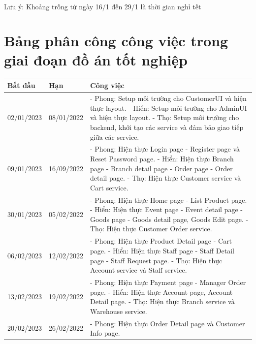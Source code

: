 Lưu ý: Khoảng trống từ ngày 16/1 đến 29/1 là thời gian nghỉ tết

\newpage
\section{Bảng phân công công việc trong giai đoạn đồ án tốt nghiệp}
{
\setlength\extrarowheight{6pt}
\begin{longtable}{| p{2cm} | p{2cm} | p{10cm} |}

	\hline
	\textbf{Bắt đầu} & \textbf{Hạn} & \textbf{Công việc} \\
	\hline
	02/01/2023 & 08/01/2022 & 
    - Phong: Setup môi trường cho CustomerUI và hiện thực layout. 
    \newline
    - Hiển: Setup môi trường cho AdminUI và hiện thực layout.
    \newline
    - Thọ: Setup môi trường cho backend, khởi tạo các service và đảm bảo giao tiếp giữa các service. \\
	\hline
	09/01/2023 & 16/09/2022 & 
    - Phong: Hiện thực Login page - Register page và Reset Password page. 
    \newline
    - Hiển: Hiện thực Branch page - Branch detail page - Order page - Order detail page. 
    \newline
    - Thọ: Hiện thực Customer service và Cart service. \\
	\hline
	30/01/2023 & 05/02/2022 & 
    - Phong: Hiện thực Home page - List Product page. 
    \newline
    - Hiển: Hiện thực Event page - Event detail page - Goods page - Goods detail page, Goods Edit page. 
    \newline
    - Thọ: Hiện thực Customer Order service. \\
	\hline
	06/02/2023 & 12/02/2022 & 
    - Phong: Hiện thực Product Detail page - Cart page. 
    \newline
    - Hiển: Hiện thực Staff page - Staff Detail page - Staff Request page. 
    \newline
    - Thọ: Hiện thực Account service và Staff service. \\
	\hline
	13/02/2023 & 19/02/2022 & 
    - Phong: Hiện thực Payment page - Manager Order page. 
    \newline
    - Hiển: Hiện thực Account page, Account Detail page. 
    \newline
    - Thọ: Hiện thực Branch service và Warehouse service. \\
	\hline
	20/02/2023 & 26/02/2022 & 
    - Phong: Hiện thực Order Detail page và Customer Info page. 

\end{longtable}}
